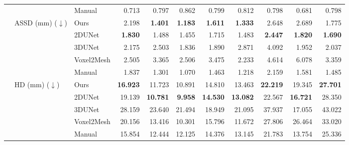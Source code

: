 \documentclass[times,review,preprint,authoryear]{elsarticle}
\begin{document}
\begin{table}
{\begin{tabular}{lllrrrrrrrr}
\cline{3-11}
  &         & Manual &   0.713 &   0.797 &   0.862 &   0.799 &   0.812 &   0.798 &   0.681 &   0.798 \\
\cline{2-11}
  & \multirow{5}{*}{ASSD (mm) ($\downarrow$)} & Ours &   2.198 &   \textbf{1.401} &   \textbf{1.183} &   \textbf{1.611} &   \textbf{1.333} &   2.648 &   2.689 &   1.775 \\
  &         & 2DUNet &   \textbf{1.830} &   1.488 &   1.455 &   1.715 &   1.483 &   \textbf{2.447} &   \textbf{1.820} &   \textbf{1.690} \\
  &         & 3DUNet &   2.175 &   2.503 &   1.836 &   1.890 &   2.871 &   4.092 &   1.952 &   2.037 \\
  &         & Voxel2Mesh &   2.505 &   3.365 &   2.506 &   3.475 &   2.233 &   4.614 &   6.078 &   3.359 \\
\cline{3-11}
  &         & Manual &   1.837 &   1.301 &   1.070 &   1.463 &   1.218 &   2.159 &   1.581 &   1.485 \\
\cline{2-11}
  & \multirow{5}{*}{HD (mm) ($\downarrow$)} & Ours &  \textbf{16.923} &  11.723 &  10.891 &  14.810 &  13.463 &  \textbf{22.219} &  19.345 &  \textbf{27.701} \\
  &         & 2DUNet &  19.139 &  \textbf{10.781} &   \textbf{9.958} &  \textbf{14.530} &  \textbf{13.082} &  22.567 &  \textbf{16.721} &  28.350 \\
  &         & 3DUNet &  28.159 &  23.640 &  21.494 &  18.949 &  21.095 &  37.937 &  17.055 &  43.022 \\
  &         & Voxel2Mesh &  20.156 &  13.416 &  10.301 &  15.796 &  11.672 &  27.806 &  26.464 &  33.020 \\
\cline{3-11}
  &         & Manual &  15.854 &  12.444 &  12.125 &  14.376 &  13.145 &  21.783 &  13.754 &  25.336 \\
\bottomrule
\end{tabular}
}
\end{table}
\end{document}
